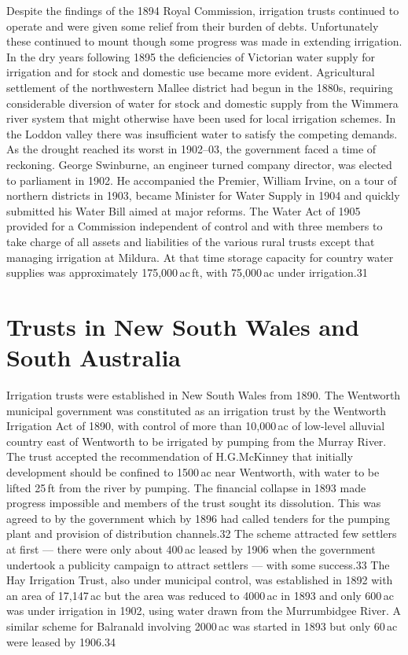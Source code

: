 Despite the findings of the 1894 Royal Commission, irrigation trusts
continued to operate and were given some relief from their burden of
debts. Unfortunately these continued to mount though some progress was
made in extending irrigation. In the dry years following 1895 the
deficiencies of Victorian water supply for irrigation and for stock
and domestic use became more evident. Agricultural settlement of the
northwestern Mallee district had begun in the 1880s, requiring
considerable diversion of water for stock and domestic supply from the
Wimmera river system that might otherwise have been used for local
irrigation schemes. In the Loddon valley there was insufficient water
to satisfy the competing demands. As the drought reached its worst in
1902--03, the government faced a time of reckoning. George Swinburne,
an engineer turned company director, was elected to parliament in
1902. He accompanied the Premier, William Irvine, on a tour of
northern districts in 1903, became Minister for Water Supply in 1904
and quickly submitted his Water Bill aimed at major reforms. The Water
Act of 1905 provided for a Commission independent of control and with
three members to take charge of all assets and liabilities of the
various rural trusts except that managing irrigation at Mildura. At
that time storage capacity for country water supplies was
approximately 175,000\,ac\,ft, with 75,000\,ac under irrigation.31

\section{Trusts in New South Wales and South Australia}

Irrigation trusts were established in New South Wales from 1890. The
Wentworth municipal government was constituted as an irrigation trust
by the Wentworth Irrigation Act of 1890, with control of more than
10,000\,ac of low-level alluvial country east of Wentworth to be
irrigated by pumping from the Murray River. The trust accepted the
recommendation of H.G.McKinney that initially development should be
confined to 1500\,ac near Wentworth, with water to be lifted 25\,ft
from the river by pumping. The financial collapse in 1893 made
progress impossible and members of the trust sought its
dissolution. This was agreed to by the government which by 1896 had
called tenders for the pumping plant and provision of distribution
channels.32 The scheme attracted few settlers at first --- there were
only about 400\,ac leased by 1906 when the government undertook a
publicity campaign to attract settlers --- with some success.33 The
Hay Irrigation Trust, also under municipal control, was established in
1892 with an area of 17,147\,ac but the area was reduced to 4000\,ac
in 1893 and only 600\,ac was under irrigation in 1902, using water
drawn from the Murrumbidgee River. A similar scheme for Balranald
involving 2000\,ac was started in 1893 but only 60\,ac were leased by
1906.34

